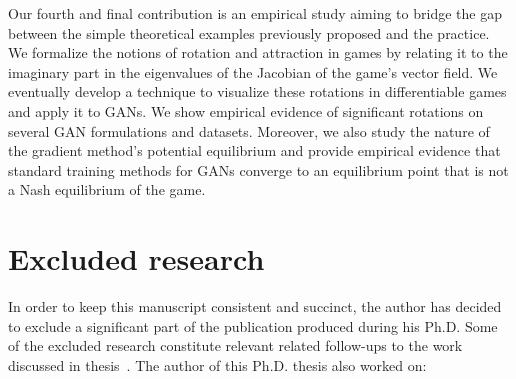 Our fourth and final contribution is an empirical study aiming to bridge the gap between the simple theoretical examples previously proposed and the practice. We formalize the notions of rotation and attraction in games by relating it to the imaginary part in the eigenvalues of the Jacobian of the game’s vector field. 
We eventually develop a technique to visualize these rotations in differentiable games and apply it to GANs. We show empirical evidence of significant rotations on several GAN formulations and datasets.
Moreover, we also study the nature of the gradient method's potential equilibrium and provide empirical evidence that standard training methods for GANs converge to an equilibrium point that is not a Nash equilibrium of the game.


































\section{Excluded research}




In order to keep this manuscript consistent and succinct, the author has decided to exclude a significant part of the publication produced during his Ph.D. Some of the excluded research constitute relevant related follow-ups to the work discussed in thesis~\citep{huang2017parametric,chavdarova2019reducing,azizian2020tight,azizian2020accelerating,bailey2019finite,ibrahim2020linear}. The author of this Ph.D. thesis also worked on:

